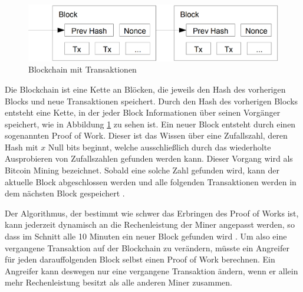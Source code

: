 \documentclass{scrreprt}
\begin{document}
\begin{figure}
    \centering
    \label{fig:btc_blockchain}
    \includegraphics[width=0.5\linewidth]{BitcoinBlockchain.png}
    \caption{Blockchain mit Transaktionen \cite{btc-nakamoto2008bitcoin}}
\end{figure}

Die Blockchain ist eine Kette an Blöcken, die jeweils den Hash des vorherigen Blocks und neue Transaktionen speichert. Durch den Hash des vorherigen Blocks entsteht eine Kette, in der jeder Block Informationen über seinen Vorgänger speichert, wie in Abbildung \ref{fig:btc_blockchain} zu sehen ist. Ein neuer Block entsteht durch einen sogenannten Proof of Work. Dieser ist das Wissen über eine Zufallszahl, deren Hash mit $x$ Null bits beginnt, welche ausschließlich durch das wiederholte Ausprobieren von Zufallszahlen gefunden werden kann. Dieser Vorgang wird als Bitcoin Mining bezeichnet. Sobald eine solche Zahl gefunden wird, kann der aktuelle Block abgeschlossen werden und alle folgenden Transaktionen werden in dem nächsten Block gespeichert \cite{btc-nakamoto2008bitcoin}.

Der Algorithmus, der bestimmt wie schwer das Erbringen des Proof of Works ist, kann jederzeit dynamisch an die Rechenleistung der Miner angepasst werden, so dass im Schnitt alle 10 Minuten ein neuer Block gefunden wird \cite{btc-Zaghloul2019Bitcoin}. Um also eine vergangene Transaktion auf der Blockchain zu verändern, müsste ein Angreifer für jeden darauffolgenden Block selbst einen Proof of Work berechnen. Ein Angreifer kann deswegen nur eine vergangene Transaktion ändern, wenn er allein mehr Rechenleistung besitzt als alle anderen Miner zusammen. \\
\end{document}
